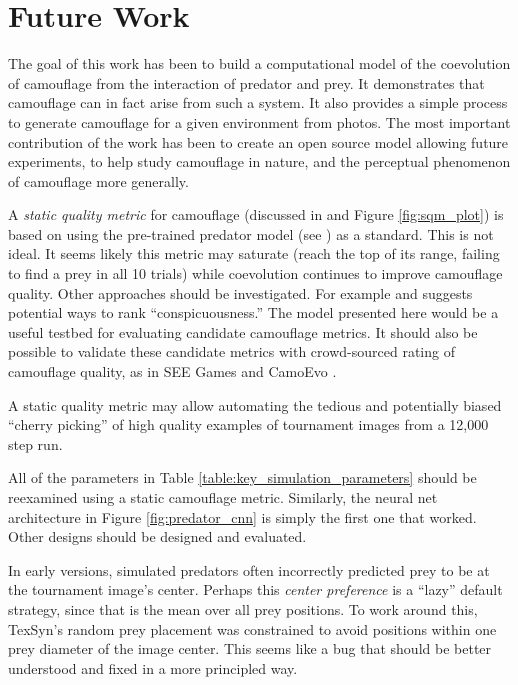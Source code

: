 \documentclass[letterpaper]{article}
\newcommand{\jargon}[1]{\textit{#1}}
\newcommand{\texsyn}[0]{TexSyn}
\begin{document}
\section{Future Work}
The goal of this work has been to build a computational model of the coevolution of camouflage from the interaction of predator and prey. It demonstrates that camouflage can in fact arise from such a system. It also provides a simple process to generate camouflage for a given environment from photos. The most important contribution of the work has been to create an open source model allowing future experiments, to help study camouflage in nature, and the perceptual phenomenon of camouflage more generally.
\par
A \jargon{static quality metric} for camouflage (discussed in  and Figure \ref{fig:sqm_plot}) is based on using the pre-trained predator model (see ) as a standard. This is not ideal. It seems likely this metric may saturate (reach the top of its range, failing to find a prey in all 10 trials) while coevolution continues to improve camouflage quality. Other approaches should be investigated. For example \citet{lv_cod_2022} and \citet{volonakis_camouflage_2018} suggests potential ways to rank “conspicuousness.” The model presented here would be a useful testbed for evaluating candidate camouflage metrics. It should also be possible to validate these candidate metrics with crowd-sourced rating of camouflage quality, as in SEE Games \citep{stevens_games_2022} and CamoEvo \citep{hancock_camoevo_2022}.
\par
A static quality metric may allow automating the tedious and potentially biased “cherry picking” of high quality examples of tournament images from a 12,000 step run.
\par
All of the parameters in Table \ref{table:key_simulation_parameters} should be reexamined using a static camouflage metric. Similarly, the neural net architecture in Figure \ref{fig:predator_cnn} is simply the first one that worked. Other designs should be designed and evaluated.
\par
\par
In early versions, simulated predators often incorrectly predicted prey to be at the tournament image's center. Perhaps this \jargon{center preference} is a “lazy” default strategy, since that is the mean over all prey positions. To work around this, \texsyn{}'s random prey placement was constrained to avoid positions within one prey diameter of the image center. This seems like a bug that should be better understood and fixed in a more principled way.
\end{document}

